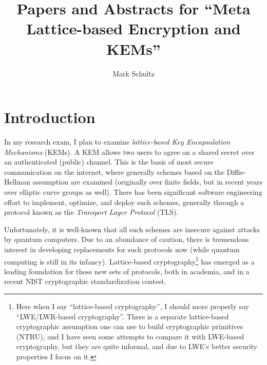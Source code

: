 \documentclass{article}
\begin{document}
	\title{Papers and Abstracts for ``Meta Lattice-based Encryption and KEMs''}
	\author{Mark Schultz}
	\maketitle
	\section{Introduction}
	In my research exam, I plan to examine \emph{lattice-based Key Encapsulation Mechanisms} (KEMs).
	A KEM allows two users to agree on a shared secret over an authenticated (public) channel.
	This is the basis of most secure communication on the internet, where generally schemes based on the Diffie-Hellman assumption are examined (originally over finite fields, but in recent years over elliptic curve groups as well).
	There has been significant software engineering effort to implement, optimize, and deploy such schemes, generally through a protocol known as the \emph{Transport Layer Protocol} (TLS).
	
	Unfortunately, it is well-known that all such schemes are insecure against attacks by quantum computers.
	Due to an abundance of caution, there is tremendous interest in developing replacements for such protocols now (while quantum computing is still in its infancy).
	Lattice-based cryptography\footnote{Here when I say ``lattice-based cryptography'', I should more properly say ``LWE/LWR-based cryptography''. There is a separate lattice-based cryptographic assumption one can use to build cryptographic primitives (NTRU), and I have seen some attempts to compare it with LWE-based cryptography, but they are quite informal, and due to LWE's better security properties I focus on it.} has emerged as a leading foundation for these new sets of protocols, both in academia, and in a recent NIST cryptographic standardization contest.
	
\end{document}
